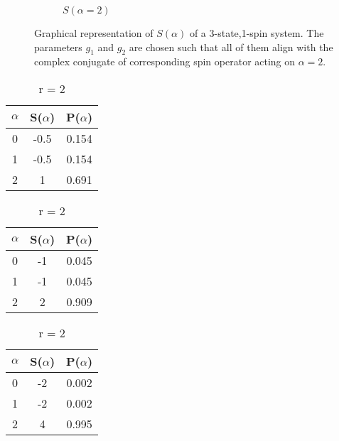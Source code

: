\begin{figure}[h]
\begin{subfigure}[b]{0.33\textwidth}
{}
        \caption{$S(\alpha = 2)$}\label{fig:case_1_s_alpha_2}
    \end{subfigure}
    \caption{Graphical representation of $S({\alpha})$ of a 3-state,1-spin system. The parameters $g_1$ and $g_2$ are chosen such that all of them align with the complex conjugate of corresponding spin operator acting on $\alpha=2$.}
    \label{fig:s_alpha}
\end{figure}

\begin{table}[h]
    \centering
    \caption{Numerical values for S($\alpha$) and P($\alpha$).}
    \label{tab:case_1_num_values}
    \begin{subtable}{.3\textwidth}
        \centering
        \caption{r = 0.5}
        \begin{tabular}{ccc}
            \toprule
             $\alpha$ & S($\alpha$) & P($\alpha$)\\
            \midrule
            0 & -0.5 & 0.154 \\
            1 & -0.5 & 0.154 \\
            2 & 1 & 0.691 \\
          \bottomrule
        \end{tabular}
    \end{subtable}%
    \begin{subtable}{.3\textwidth}
        \centering
        \caption{r = 1}
        \begin{tabular}{ccc}
            \toprule
             $\alpha$ & S($\alpha$) & P($\alpha$)\\
            \midrule
            0 & -1 & 0.045 \\
            1 & -1 & 0.045 \\
            2 & 2 & 0.909 \\
          \bottomrule
        \end{tabular}
    \end{subtable}%
    \begin{subtable}{.3\textwidth}
        \centering
        \caption{r = 2}
        \begin{tabular}{ccc}
            \toprule
            $\alpha$ & S($\alpha$) & P($\alpha$)\\
            \midrule
            0 & -2 & 0.002 \\
            1 & -2 & 0.002 \\
            2 & 4 & 0.995 \\
            \bottomrule
        \end{tabular}
    \end{subtable}
\end{table}

